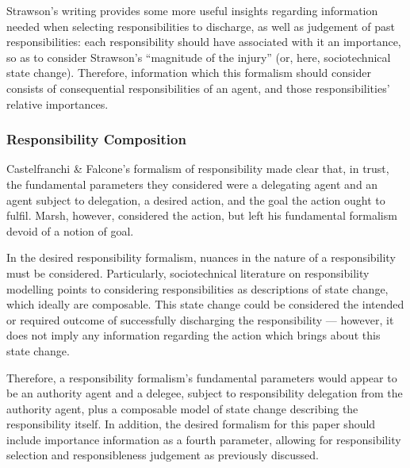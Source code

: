 Strawson's writing provides some more useful insights regarding information needed when selecting responsibilities to discharge, as well as judgement of past responsibilities: each responsibility should have associated with it an importance, so as to consider Strawson's ``magnitude of the injury'' (or, here, sociotechnical state change). Therefore, information which this formalism should consider consists of consequential responsibilities of an agent, and those responsibilities' relative importances.\par

\subsubsection{Responsibility Composition}
Castelfranchi \& Falcone's formalism of responsibility made clear that, in trust, the fundamental parameters they considered were a delegating agent and an agent subject to delegation, a desired action, and the goal the action ought to fulfil. Marsh, however, considered the action, but left his fundamental formalism devoid of a notion of goal.\par

In the desired responsibility formalism, nuances in the nature of a responsibility must be considered. Particularly, sociotechnical literature on responsibility modelling points to considering responsibilities as descriptions of state change, which ideally are composable. This state change could be considered the intended or required outcome of successfully discharging the responsibility --- however, it does not imply any information regarding the action which brings about this state change.\par

Therefore, a responsibility formalism's fundamental parameters would appear to be an authority agent and a delegee, subject to responsibility delegation from the authority agent, plus a composable model of state change describing the responsibility itself. In addition, the desired formalism for this paper should include importance information as a fourth parameter, allowing for responsibility selection and responsibleness judgement as previously discussed.\par

